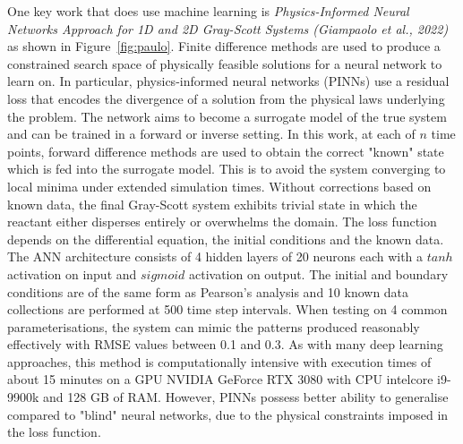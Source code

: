 One key work that does use machine learning is \textit{Physics-Informed Neural Networks Approach for 1D and 2D Gray-Scott Systems (Giampaolo et al., 2022)}\cite{giampaolo2022physics} as shown in Figure~\ref{fig:paulo}. Finite difference methods are used to produce a constrained search space of physically feasible solutions for a neural network to learn on. In particular, physics-informed neural networks (PINNs) use a residual loss that encodes the divergence of a solution from the physical laws underlying the problem. The network aims to become a surrogate model of the true system and can be trained in a forward or inverse setting. In this work, at each of $n$ time points, forward difference methods are used to obtain the correct "known" state which is fed into the surrogate model. This is to avoid the system converging to local minima under extended simulation times. Without corrections based on known data, the final Gray-Scott system exhibits trivial state in which the reactant either disperses entirely or overwhelms the domain. The loss function depends on the differential equation, the initial conditions and the known data.\\

The ANN architecture consists of 4 hidden layers of 20 neurons each with a $\mathit{tanh}$ activation on input and $\mathit{sigmoid}$ activation on output. The initial and boundary conditions are of the same form as Pearson's analysis and 10 known data collections are performed at 500 time step intervals. When testing on 4 common parameterisations, the system can mimic the patterns produced reasonably effectively with RMSE values between 0.1 and 0.3. As with many deep learning approaches, this method is computationally intensive with execution times of about 15 minutes on a GPU NVIDIA GeForce RTX 3080 with CPU intelcore i9-9900k and 128 GB of RAM. However, PINNs possess better ability to generalise compared to "blind" neural networks, due to the physical constraints imposed in the loss function.

